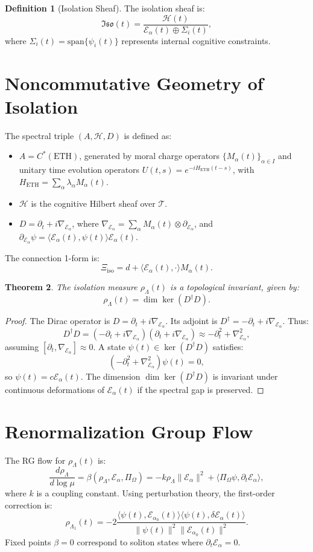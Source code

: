 \documentclass[12pt]{article}
\theoremstyle{plain}
\newtheorem{theorem}{Theorem}[section]
\theoremstyle{definition}
\newtheorem{definition}[theorem]{Definition}
\theoremstyle{remark}
\newcommand{\Hil}{\mathcal{H}}
\newcommand{\Eth}{\mathcal{E}_\alpha}
\newcommand{\Iso}{\mathfrak{Iso}}
\newcommand{\Tbase}{\mathcal{T}}
\newcommand{\rhol}{\rho_\Lambda}
\newcommand{\Xiso}{\Xi_{\text{iso}}}
\newcommand{\pii}{\Pi_\Omega}
\begin{document}
\begin{definition}[Isolation Sheaf]
The isolation sheaf is:
\[
\Iso(t) = \frac{\Hil(t)}{\Eth(t) \oplus \Sigma_i(t)},
\]
where $\Sigma_i(t) = \text{span}\{\psi_i(t)\}$ represents internal cognitive constraints.
\end{definition}

\section{Noncommutative Geometry of Isolation}
The spectral triple $(A, \Hil, D)$ is defined as:
\begin{itemize}
    \item $A = C^*(\text{ETH})$, generated by moral charge operators $\{M_\alpha(t)\}_{\alpha \in I}$ and unitary time evolution operators $U(t, s) = e^{-i H_{\text{ETH}}(t-s)}$, with $H_{\text{ETH}} = \sum_\alpha \lambda_\alpha M_\alpha(t)$.
    \item $\Hil$ is the cognitive Hilbert sheaf over $\Tbase$.
    \item $D = \partial_t + i \nabla_{\Eth}$, where $\nabla_{\Eth} = \sum_\alpha M_\alpha(t) \otimes \partial_{\Eth}$, and $\partial_{\Eth} \psi = \langle \Eth(t), \psi(t) \rangle \Eth(t)$.
\end{itemize}
The connection 1-form is:
\[
\Xiso = d + \langle \Eth(t), \cdot \rangle M_\alpha(t).
\]

\begin{theorem}
The isolation measure $\rhol(t)$ is a topological invariant, given by:
\[
\rhol(t) = \dim \ker(D^\dagger D).
\]
\end{theorem}
\begin{proof}
The Dirac operator is $D = \partial_t + i \nabla_{\Eth}$. Its adjoint is $D^\dagger = -\partial_t + i \nabla_{\Eth}$. Thus:
\[
D^\dagger D = (-\partial_t + i \nabla_{\Eth})(\partial_t + i \nabla_{\Eth}) \approx -\partial_t^2 + \nabla_{\Eth}^2,
\]
assuming $[\partial_t, \nabla_{\Eth}] \approx 0$. A state $\psi(t) \in \ker(D^\dagger D)$ satisfies:
\[
(-\partial_t^2 + \nabla_{\Eth}^2) \psi(t) = 0,
\]
so $\psi(t) = c \Eth(t)$. The dimension $\dim \ker(D^\dagger D)$ is invariant under continuous deformations of $\Eth(t)$ if the spectral gap is preserved.
\end{proof}

\section{Renormalization Group Flow}
The RG flow for $\rhol(t)$ is:
\[
\frac{d \rhol}{d \log \mu} = \beta(\rhol, \Eth, \pii) = -k \rhol \|\Eth\|^2 + \langle \pii \psi, \partial_t \Eth \rangle,
\]
where $k$ is a coupling constant. Using perturbation theory, the first-order correction is:
\[
\rhol_1(t) = -2 \frac{\langle \psi(t), \Eth_0(t) \rangle \langle \psi(t), \delta \Eth(t) \rangle}{\|\psi(t)\|^2 \|\Eth_0(t)\|^2}.
\]
Fixed points $\beta = 0$ correspond to soliton states where $\partial_t \Eth = 0$.
\end{document}
